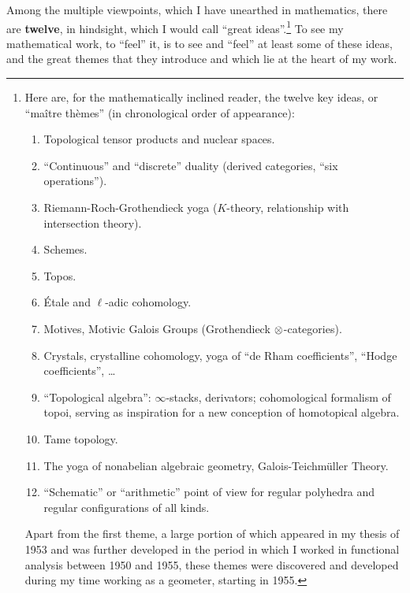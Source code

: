 Among the multiple viewpoints, which I have unearthed in mathematics,
there are \textbf{twelve}, in hindsight, which I would call ``great ideas''.\footnote{Here
are, for the mathematically inclined reader, the twelve key ideas, or ``ma\^itre th\`emes''
(in chronological order of appearance):
\begin{enumerate}
\item Topological tensor products and nuclear spaces.
\item ``Continuous'' and ``discrete''  duality (derived categories, ``six operations'').
\item Riemann-Roch-Grothendieck yoga ($K$-theory, relationship with intersection theory).
\item Schemes.
\item Topos.
\item \'Etale and $\ell$-adic cohomology.
\item Motives, Motivic Galois Groups (Grothendieck $\otimes$-categories).
\item Crystals, crystalline cohomology, yoga of ``de Rham coefficients'', ``Hodge
coefficients'', \ldots
\item ``Topological algebra'': $\infty$-stacks, derivators;
cohomological formalism of topoi, serving as inspiration for a new conception of
homotopical algebra.
\item Tame topology.
\item The yoga of nonabelian algebraic geometry, Galois-Teichm\"uller Theory.
\item ``Schematic'' or ``arithmetic'' point of view for regular polyhedra and regular
configurations of all kinds.
\end{enumerate}
Apart from the first theme, a large portion of which appeared in my thesis of 1953 and
was further developed in the period in which I worked in functional analysis between 1950
and 1955, these themes were discovered and developed during my time working as a geometer,
starting in 1955.}
To see my mathematical work, to ``feel'' it, is to
see and ``feel'' 
at least some of these ideas, and the great themes that they introduce and which lie at the
heart of my work.

